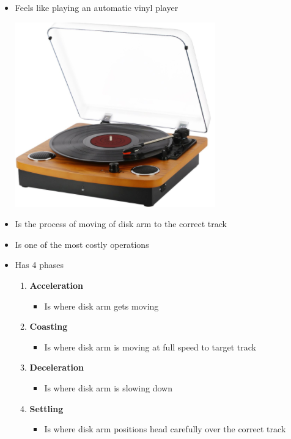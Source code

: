 \documentclass[12pt]{article}
\begin{document}
\begin{itemize}
    \begin{itemize}
        \item Feels like playing an automatic vinyl player

        \begin{center}
            \includegraphics[width=0.4\linewidth]{../images/midterm_4_solution_56.png}
        \end{center}

        \item Is the process of moving of disk arm to the correct track
        \item Is one of the most costly operations
        \item Has 4 phases
        \begin{enumerate}[1.]
            \item \textbf{Acceleration}
            \begin{itemize}
                \item Is where disk arm gets moving
            \end{itemize}
            \item \textbf{Coasting}
            \begin{itemize}
                \item Is where disk arm is moving at full speed to target track
            \end{itemize}
            \item \textbf{Deceleration}
            \begin{itemize}
                \item Is where disk arm is slowing down
            \end{itemize}
            \item \textbf{Settling}
            \begin{itemize}
                \item Is where disk arm positions head carefully over the correct track
            \end{itemize}
        \end{enumerate}
    \end{itemize}


\end{itemize}
\end{document}
